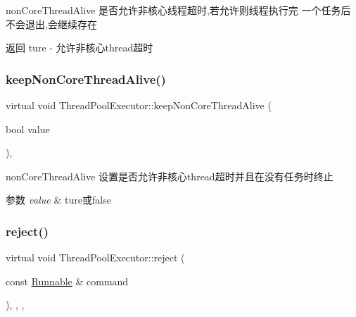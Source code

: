 non\+Core\+Thread\+Alive 是否允许非核心线程超时,若允许则线程执行完 一个任务后不会退出,会继续存在 

\begin{DoxyReturn}{返回}
ture -\/ 允许非核心thread超时 
\end{DoxyReturn}
\mbox{\label{classThreadPoolExecutor_a7e6ed2d088147377d1e82018ac3dac1d}} 
\subsubsection{\texorpdfstring{keep\+Non\+Core\+Thread\+Alive()}{keepNonCoreThreadAlive()}\hspace{0.1cm}{\footnotesize\ttfamily [2/2]}}
{\footnotesize\ttfamily virtual void Thread\+Pool\+Executor\+::keep\+Non\+Core\+Thread\+Alive (\begin{DoxyParamCaption}\item[{bool}]{value }\end{DoxyParamCaption})\hspace{0.3cm}{\ttfamily [final]}, {\ttfamily [virtual]}}



non\+Core\+Thread\+Alive 设置是否允许非核心thread超时并且在没有任务时终止 


\begin{DoxyParams}{参数}
{\em value} & ture或false \\
\hline
\end{DoxyParams}
\mbox{\label{classThreadPoolExecutor_a14c4e3d786dcf22e858b11a95d2f77ef}} 
\subsubsection{\texorpdfstring{reject()}{reject()}\hspace{0.1cm}{\footnotesize\ttfamily [1/2]}}
{\footnotesize\ttfamily virtual void Thread\+Pool\+Executor\+::reject (\begin{DoxyParamCaption}\item[{const \hyperlink{classRunnable}{Runnable} \&}]{command }\end{DoxyParamCaption})\hspace{0.3cm}{\ttfamily [inline]}, {\ttfamily [final]}, {\ttfamily [protected]}, {\ttfamily [virtual]}}




